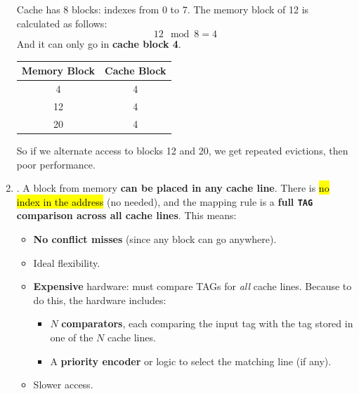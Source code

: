 \begin{enumerate}
\begin{itemize}
\begin{figure}[!htp]
        \end{figure}
    \end{itemize}
    \begin{examplebox}
        Cache has 8 blocks: indexes from 0 to 7. The memory block of 12 is calculated as follows:
        \begin{equation*}
            12 \mod 8 = 4
        \end{equation*}
        And it can only go in \textbf{cache block 4}.
        \begin{center}
            \begin{tabular}{@{} c c @{}}
                \toprule
                Memory Block & Cache Block \\
                \midrule
                4   & 4 \\ [.3em]
                12  & 4 \\ [.3em]
                20  & 4 \\
                \bottomrule
            \end{tabular}
        \end{center}
        So if we alternate access to blocks 12 and 20, we get repeated evictions, then poor performance.
    \end{examplebox}


    \item {}. A block from memory \textbf{can be placed in any cache line}. There is \hl{no index in the address} (no needed), and the mapping rule is a \textbf{full \texttt{TAG} comparison across all cache lines}. This means:
    \begin{itemize}
        \item[\textcolor{Green3}{\faIcon{check-circle}}] \textbf{No conflict misses} (since any block can go anywhere).
        \item[\textcolor{Green3}{\faIcon{check-circle}}] Ideal flexibility.
        \item[\textcolor{Red2}{\faIcon{times-circle}}] \textbf{Expensive} hardware: must compare TAGs for \emph{all} cache lines. Because to do this, the hardware includes:
        \begin{itemize}
            \item $N$ \textbf{comparators}, each comparing the input tag with the tag stored in one of the $N$ cache lines.
            \item A \textbf{priority encoder} or logic to select the matching line (if any).
        \end{itemize}
        \item[\textcolor{Red2}{\faIcon{times-circle}}] Slower access.
    \end{itemize}



\end{enumerate}
